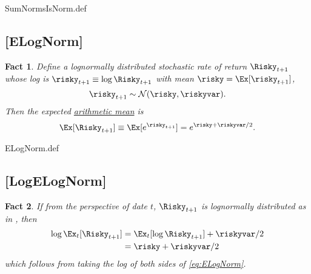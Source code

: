 \documentclass{handout}
\newtheorem{Fact}{Fact}
\begin{document}
\begin{verbatimwrite}{SumNormsIsNorm.def}
\providecommand{\SumNormsIsNorm}{\href{https://www.econ2.jhu.edu/people/ccarroll/public/LectureNotes/MathFacts/MathFactsList\#SumNormsIsNorm}{\ensuremath{\mathtt{[SumNormsIsNorm]}}}}
\end{verbatimwrite}

\hypertarget{ELogNorm}{}
\subsection{{[{ELogNorm}]}}

\begin{Fact} Define a lognormally distributed stochastic rate of return $\Risky_{t+1}$ whose log is $\risky_{t+1} \equiv \log \Risky_{t+1}$ with mean $\risky = \Ex[\risky_{t+1}]$,
  \begin{equation}
    \risky_{t+1} \sim \mathcal{N}(\risky,\riskyvar).
  \end{equation}
 Then the expected \href{https://en.wikipedia.org/wiki/Log-normal_distribution#Arithmetic_moments}{arithmetic mean} is 
\begin{equation}
        \Ex[\Risky_{t+1}]\equiv\Ex[e^{\risky_{t+1}}] = e^{\null{\risky}+\riskyvar/2} \label{eq:ELogNorm}.
      \end{equation}
\end{Fact}

\begin{verbatimwrite}{ELogNorm.def}
\providecommand{\ELogNorm}{\href{https://www.econ2.jhu.edu/people/ccarroll/public/LectureNotes/MathFacts/MathFactsList\#ELogNorm}{\ensuremath{\mathtt{[ELogNorm]}}}}
\end{verbatimwrite}

\hypertarget{LogELogNorm}{}
\subsection{[LogELogNorm]}

\begin{Fact} If from the perspective of date $t$, $\Risky_{t+1}$ is lognormally distributed as in {\ELogNorm}, then
\begin{equation}\begin{gathered}\begin{aligned}
        \log \Ex_{t}[\Risky_{t+1}] & =  \Ex_{t}[\log \Risky_{t+1}]+\riskyvar/2
\\ & =  \risky +\riskyvar/2
\end{aligned}\end{gathered}\end{equation}
which follows from taking the log of both sides of \eqref{eq:ELogNorm}.
\end{Fact}
\end{document}
